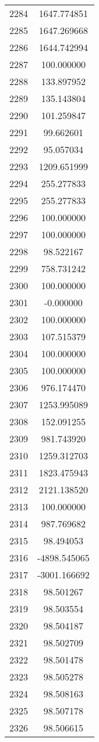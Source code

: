 \documentclass[12pt]{article}
\begin{document}
\begin{longtable}{@{}cc@{}}
2284 & 1647.774851 \\
2285 & 1647.269668 \\
2286 & 1644.742994 \\
2287 & 100.000000 \\
2288 & 133.897952 \\
2289 & 135.143804 \\
2290 & 101.259847 \\
2291 & 99.662601 \\
2292 & 95.057034 \\
2293 & 1209.651999 \\
2294 & 255.277833 \\
2295 & 255.277833 \\
2296 & 100.000000 \\
2297 & 100.000000 \\
2298 & 98.522167 \\
2299 & 758.731242 \\
2300 & 100.000000 \\
2301 & -0.000000 \\
2302 & 100.000000 \\
2303 & 107.515379 \\
2304 & 100.000000 \\
2305 & 100.000000 \\
2306 & 976.174470 \\
2307 & 1253.995089 \\
2308 & 152.091255 \\
2309 & 981.743920 \\
2310 & 1259.312703 \\
2311 & 1823.475943 \\
2312 & 2121.138520 \\
2313 & 100.000000 \\
2314 & 987.769682 \\
2315 & 98.494053 \\
2316 & -4898.545065 \\
2317 & -3001.166692 \\
2318 & 98.501267 \\
2319 & 98.503554 \\
2320 & 98.504187 \\
2321 & 98.502709 \\
2322 & 98.501478 \\
2323 & 98.505278 \\
2324 & 98.508163 \\
2325 & 98.507178 \\
2326 & 98.506615 \\

\end{longtable}
\end{document}

